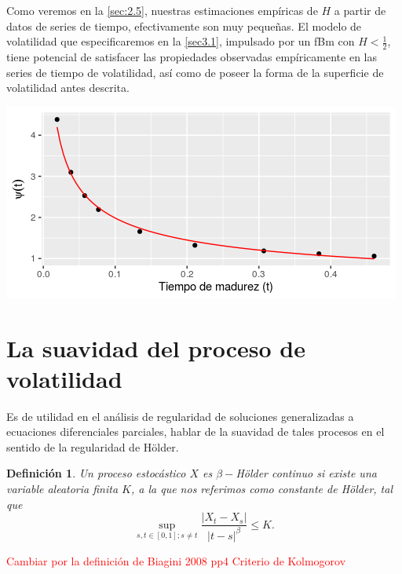 \documentclass[letterpaper,12pt,oneside]{book}
\theoremstyle{plain}
\newtheorem{dfn}[theorem]{Definición}
\numberwithin{theorem}{section}
\begin{document}
Como veremos en la \cref{sec:2.5}, nuestras estimaciones empíricas de $H$ a partir de datos de series de tiempo, efectivamente son muy pequeñas. El modelo de volatilidad que especificaremos en la \cref{sec3.1}, impulsado por un fBm con $H <\frac{1}{2}$, tiene potencial de satisfacer  las propiedades observadas empíricamente en las series de tiempo de volatilidad, así como de poseer la forma de la superficie de volatilidad antes descrita.
\begin{center}
	\includegraphics[scale=1.2]{fig2.png}
	\label{fig1.2}
\end{center}
\section{La suavidad del proceso de volatilidad}\label{sec:1.2}
Es de utilidad en el análisis de regularidad de soluciones generalizadas a ecuaciones diferenciales parciales, hablar de la suavidad de tales procesos en el sentido de la regularidad de Hölder.
\begin{dfn}
Un proceso estocástico $X$ es $\beta-$Hölder continuo si existe una variable aleatoria finita $K$, a la que nos referimos como \textsl{constante de Hölder}, tal que
$$\sup_{s,t\in[0,1];s\neq t}\frac{|X_t-X_s|}{|t-s|^\beta}\leq K.$$
\end{dfn}
\textcolor{red}{Cambiar por la definición de Biagini 2008 pp4 Criterio de Kolmogorov}
\end{document}
